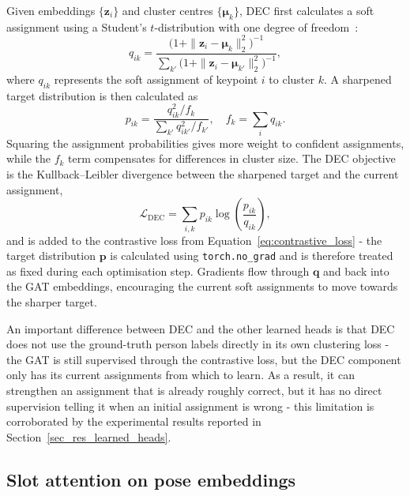 Given embeddings $\{\mathbf{z}_i\}$ and cluster centres $\{\boldsymbol{\mu}_k\}$,
DEC first calculates a soft assignment
using a Student's $t$-distribution with one degree of freedom~\cite{vandermaaten2008tsne}:
\begin{equation}
    q_{ik}
    = \frac{\bigl(1 + \|\mathbf{z}_i - \boldsymbol{\mu}_k\|_2^2\bigr)^{-1}}
           {\sum_{k'} \bigl(1 + \|\mathbf{z}_i - \boldsymbol{\mu}_{k'}\|_2^2\bigr)^{-1}},
    \label{eq:dec_q}
\end{equation}
where $q_{ik}$ represents the soft assignment of keypoint $i$ to cluster $k$.
A sharpened target distribution is then calculated as
\begin{equation}
    p_{ik}
    = \frac{q_{ik}^2 / f_k}
           {\sum_{k'} q_{ik'}^2 / f_{k'}},
    \quad
    f_k = \sum_i q_{ik}.
    \label{eq:dec_p}
\end{equation}
Squaring the assignment probabilities gives more weight to confident assignments,
while the $f_k$ term compensates for differences in cluster size.
The DEC objective is the Kullback--Leibler divergence
between the sharpened target and the current assignment,
\begin{equation}
    \mathcal{L}_{\text{DEC}}
    =
    \sum_{i,k}
    p_{ik}\log\left(\frac{p_{ik}}{q_{ik}}\right),
\end{equation}
and is added to the contrastive loss from Equation~\eqref{eq:contrastive_loss} -
the target distribution $\mathbf{p}$ is calculated using \texttt{torch.no\_grad}
and is therefore treated as fixed during each optimisation step.
Gradients flow through $\mathbf{q}$ and back into the GAT embeddings,
encouraging the current soft assignments to move towards the sharper target.

An important difference between DEC and the other learned heads
is that DEC does not use the ground-truth person labels directly in its own clustering loss -
the GAT is still supervised through the contrastive loss,
but the DEC component only has its current assignments from which to learn.
As a result,
it can strengthen an assignment that is already roughly correct,
but it has no direct supervision telling it when an initial assignment is wrong -
this limitation is corroborated by the experimental results reported in Section~\ref{sec_res_learned_heads}.

\subsection{Slot attention on pose embeddings}
\label{sec_meth_slot_pose}

